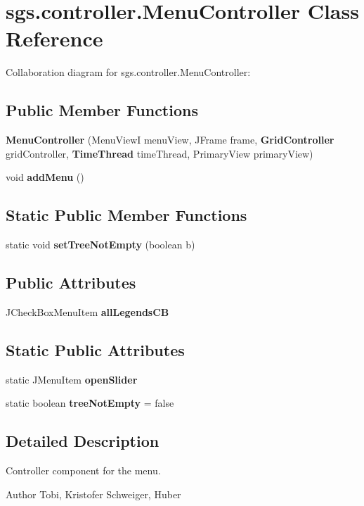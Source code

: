 \section{sgs.\-controller.\-Menu\-Controller Class Reference}
\label{classsgs_1_1controller_1_1_menu_controller}


Collaboration diagram for sgs.\-controller.\-Menu\-Controller\-:
\subsection*{Public Member Functions}
\begin{DoxyCompactItemize}
\item 
{\bf Menu\-Controller} (Menu\-View\-I menu\-View, J\-Frame frame, {\bf Grid\-Controller} grid\-Controller, {\bf Time\-Thread} time\-Thread, Primary\-View primary\-View)
\item 
void {\bf add\-Menu} ()
\end{DoxyCompactItemize}
\subsection*{Static Public Member Functions}
\begin{DoxyCompactItemize}
\item 
static void {\bf set\-Tree\-Not\-Empty} (boolean b)
\end{DoxyCompactItemize}
\subsection*{Public Attributes}
\begin{DoxyCompactItemize}
\item 
J\-Check\-Box\-Menu\-Item {\bf all\-Legends\-C\-B}
\end{DoxyCompactItemize}
\subsection*{Static Public Attributes}
\begin{DoxyCompactItemize}
\item 
static J\-Menu\-Item {\bf open\-Slider}
\item 
static boolean {\bf tree\-Not\-Empty} = false
\end{DoxyCompactItemize}


\subsection{Detailed Description}
Controller component for the menu. \begin{DoxyAuthor}{Author}
Tobi, Kristofer Schweiger, Huber 
\end{DoxyAuthor}


